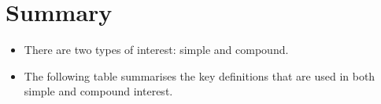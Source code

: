             \section{ Summary}
            \nopagebreak
            \label{m39335*eip-923}\begin{itemize}[noitemsep]
            \item There are two types of interest: simple and compound.\item The following table summarises the key definitions that are used in both simple and compound interest.

    
      
    
    \setlength\mytablespace{4\tabcolsep}
    \addtolength\mytablespace{3\arrayrulewidth}
    \setlength\mytablewidth{\linewidth}
        
    
    \setlength\mytableroom{\mytablewidth}
    \addtolength\mytableroom{-\mytablespace}
    
    \setlength\myfixedwidth{0pt}
    \setlength\mystarwidth{\mytableroom}
        \addtolength\mystarwidth{-\myfixedwidth}
        \divide{}
        
    
\end{itemize}
